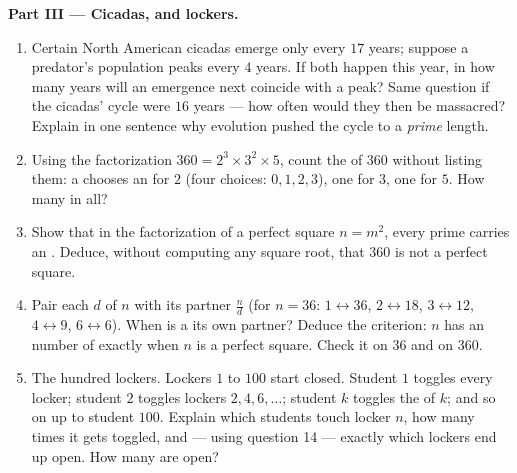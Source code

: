\begin{problem}
\medskip
\noindent\textbf{Part III --- Cicadas,  and lockers.}
\begin{enumerate}[resume]
  \item Certain North American cicadas emerge only every $17$
        years; suppose a predator's population peaks every $4$
        years. If both happen this year, in how many years will
        an emergence next coincide with a peak? Same question if
        the cicadas' cycle were $16$ years --- how often would
        they then be massacred? Explain in one sentence why
        evolution pushed the cycle to a \emph{prime} length.
  \item Using the factorization $360 = 2^3 \times 3^2 \times 5$,
        count the  of $360$ without listing them: a
         chooses an  for $2$ (four choices:
        $0, 1, 2, 3$), one for $3$, one for $5$. How many
         in all?
  \item Show that in the factorization of a perfect square
        $n = m^2$, every prime carries an \emph{} .
        Deduce, without computing any square root, that $360$ is
        not a perfect square.
  \item Pair each  $d$ of $n$ with its partner
        $\frac{n}{d}$ (for $n = 36$: $1 \leftrightarrow 36$,
        $2 \leftrightarrow 18$, $3 \leftrightarrow 12$,
        $4 \leftrightarrow 9$, $6 \leftrightarrow 6$). When is a
         its own partner? Deduce the criterion: $n$ has an
        \emph{} number of  exactly when $n$ is a
        perfect square. Check it on $36$ and on $360$.
  \item The hundred lockers. Lockers $1$ to $100$ start closed.
        Student $1$ toggles every locker; student $2$ toggles
        lockers $2, 4, 6, \dots$; student $k$ toggles the
         of $k$; and so on up to student $100$. Explain
        which students touch locker $n$, how many times it gets
        toggled, and --- using question 14 --- exactly which
        lockers end up open. How many are open?
\end{enumerate}
\end{problem}
